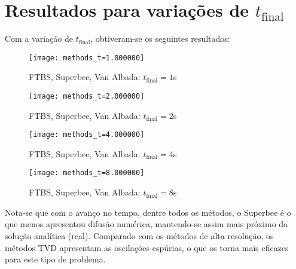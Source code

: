 \section{Resultados para variações de $t_{\text{final}}$}
Com a variação de $t_{\text{final}}$, obtiveram-se os seguintes resultados:
\begin{figure}[H]
    \centering
    \texttt{[image: methods\_t=1.000000]}
    \caption{FTBS, Superbee, Van Albada: $t_{\text{final}} = 1$s}
\end{figure}
\begin{figure}[H]
    \centering
    \texttt{[image: methods\_t=2.000000]}
    \caption{FTBS, Superbee, Van Albada: $t_{\text{final}} = 2$s}
\end{figure}
\begin{figure}[H]
    \centering
    \texttt{[image: methods\_t=4.000000]}
    \caption{FTBS, Superbee, Van Albada: $t_{\text{final}} = 4$s}
\end{figure}
\begin{figure}[H]
    \centering
    \texttt{[image: methods\_t=8.000000]}
    \caption{FTBS, Superbee, Van Albada: $t_{\text{final}} = 8$s}
\end{figure}
Nota-se que com o avanço no tempo, dentre todos os métodos, o Superbee é o
que menos apresentou difusão numérica, mantendo-se assim mais próximo da
solução analítica (real). Comparado com os métodos de alta resolução,
os métodos TVD apresentam as oscilações espúrias, o que os torna mais eficazes
para este tipo de problema.

